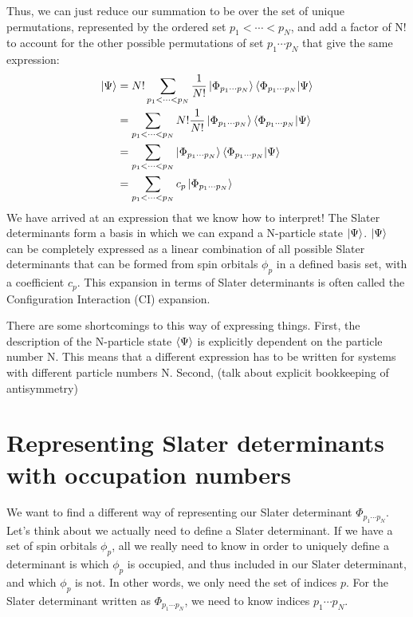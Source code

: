 \documentclass{article}
\begin{document}
Thus, we can just reduce our summation to be over the set of unique permutations, represented by the ordered set $p_1 < \cdots < p_N$, and add a factor of N! to account for the 
other possible permutations of set $p_1 \cdots p_N$ that give the same expression: 
\begin{align*}
\ket{\Psi} &=N! \sum_{p_1 < \cdots < p_N}  \frac{1}{N!} \ket{\Phi_{p_1 \cdots p_N}}\braket{\Phi_{p_1 \cdots p_N} | \Psi}   \\
&=  \sum_{p_1 < \cdots < p_N} N! \frac{1}{N!} \ket{\Phi_{p_1 \cdots p_N}}\braket{\Phi_{p_1 \cdots p_N} | \Psi}   \\
&=  \sum_{p_1 < \cdots < p_N} \ket{\Phi_{p_1 \cdots p_N}}\braket{\Phi_{p_1 \cdots p_N} | \Psi}   \\
&=  \sum_{p_1 < \cdots < p_N} c_p \ket{\Phi_{p_1 \cdots p_N}} \\
\end{align*}
We have arrived at an expression that we know how to interpret! 
The Slater determinants form a basis in which we can expand a N-particle state $\ket{\Psi}$. 
$\ket{\Psi}$ can be completely expressed as a linear combination of all possible Slater determinants that can be formed from spin orbitals $\phi_p$ in a defined basis set, with a coefficient $c_p$. 
This expansion in terms of Slater determinants is often called the Configuration Interaction (CI) expansion.

There are some shortcomings to this way of expressing things. 
First, the description of the N-particle state $\braket{\Psi}$ is explicitly dependent on the particle number N. 
This means that a different expression has to be written for systems with different particle numbers N. 
Second, (talk about explicit bookkeeping of antisymmetry)

\section{Representing Slater determinants with occupation numbers}
We want to find a different way of representing our Slater determinant $\Phi_{p_1 \cdots p_N}$. 
Let's think about we actually need to define a Slater determinant. 
If we have a set of spin orbitals $\phi_p$, all we really need to know in order to uniquely define a determinant is which $\phi_p$ is occupied, and thus included in our Slater determinant, and which $\phi_p$ is not. 
In other words, we only need the set of indices $p$. 
For the Slater determinant written as $\Phi_{p_1 \cdots p_N}$, we need to know indices $p_1 \cdots p_N$.
\end{document}
